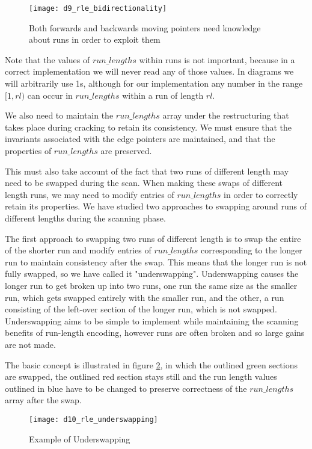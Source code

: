 \begin{figure}[H]
  \centering
  \texttt{[image: d9\_rle\_bidirectionality]}
  \caption{Both forwards and backwards moving pointers need knowledge about runs in order to exploit them}
  \label{fig:rle_bidirectionality}
\end{figure}

Note that the values of $run\_lengths$ within runs is not important, because in a correct implementation we will never read any of those values. In diagrams we will arbitrarily use 1s, although for our implementation any number in the range $[1, rl)$ can occur in $run\_lengths$ within a run of length $rl$.

We also need to maintain the $run\_lengths$ array under the restructuring that takes place during cracking to retain its consistency. We must ensure that the invariants associated with the edge pointers are maintained, and that the properties of $run\_lengths$ are preserved.

This must also take account of the fact that two runs of different length may need to be swapped during the scan. When making these swaps of different length runs, we may need to modify entries of $run\_lengths$ in order to correctly retain its properties. We have studied two approaches to swapping around runs of different lengths during the scanning phase.

The first approach to swapping two runs of different length is to swap the entire of the shorter run and modify entries of $run\_lengths$ corresponding to the longer run to maintain consistency after the swap. This means that the longer run is not fully swapped, so we have called it "underswapping". Underswapping causes the longer run to get broken up into two runs, one run the same size as the smaller run, which gets swapped entirely with the smaller run, and the other, a run consisting of the left-over section of the longer run, which is not swapped. Underswapping aims to be simple to implement while maintaining the scanning benefits of run-length encoding, however runs are often broken and so large gains are not made.

The basic concept is illustrated in figure \ref{fig:rle_underswapping}, in which the outlined green sections are swapped, the outlined red section stays still and the run length values outlined in blue have to be changed to preserve correctness of the $run\_lengths$ array after the swap.

\begin{figure}[H]
  \centering
  \texttt{[image: d10\_rle\_underswapping]}
  \caption{Example of Underswapping}
  \label{fig:rle_underswapping}
\end{figure}

